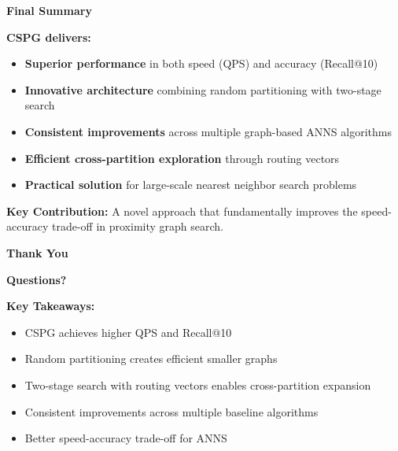 \begin{frame}
\begin{center}
\LARGE\textbf{Final Summary}
\end{center}

\vspace{15pt}

\textbf{CSPG delivers:}

\begin{itemize}
\item \textbf{Superior performance} in both speed (QPS) and accuracy (Recall@10)
\item \textbf{Innovative architecture} combining random partitioning with two-stage search
\item \textbf{Consistent improvements} across multiple graph-based ANNS algorithms
\item \textbf{Efficient cross-partition exploration} through routing vectors
\item \textbf{Practical solution} for large-scale nearest neighbor search problems
\end{itemize}

\vspace{15pt}

\textbf{Key Contribution:} A novel approach that fundamentally improves the speed-accuracy trade-off in proximity graph search.
\end{frame}%
\begin{frame}
\begin{center}
\LARGE\textbf{Thank You}
\end{center}

\vspace{20pt}

\begin{center}
\textbf{Questions?}
\end{center}

\vspace{20pt}

\begin{center}
\textbf{Key Takeaways:}
\end{center}

\begin{itemize}
\item CSPG achieves higher QPS and Recall@10
\item Random partitioning creates efficient smaller graphs
\item Two-stage search with routing vectors enables cross-partition expansion
\item Consistent improvements across multiple baseline algorithms
\item Better speed-accuracy trade-off for ANNS
\end{itemize}
\end{frame}